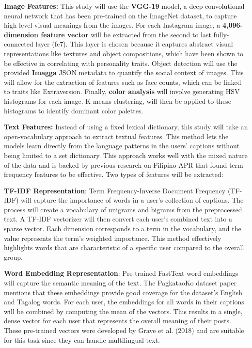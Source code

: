 \textbf{Image Features:}
This study will use the \textbf{VGG-19} model, a deep convolutional neural network that has been pre-trained on the ImageNet dataset, to capture high-level visual meanings from the images. For each Instagram image, a \textbf{4,096-dimension feature vector} will be extracted from the second to last fully-connected layer (fc7). This layer is chosen because it captures abstract visual representations like textures and object compositions, which have been shown to be effective in correlating with personality traits. Object detection will use the provided \textbf{Imagga} JSON metadata to quantify the social context of images.  This will allow for the extraction of features such as face counts, which can be linked to traits like Extraversion.  Finally, \textbf{color analysis} will involve generating HSV histograms for each image. K-means clustering, will then be applied to these histograms to identify dominant color palettes.

\textbf{Text Features:}
Instead of using a fixed lexical dictionary, this study will take an open-vocabulary approach to extract textual features. This method lets the models learn directly from the language patterns in the users' captions without being limited to a set dictionary. This approach works well with the mixed nature of the data and is backed by previous research on Filipino APR that found term-frequency features to be effective. Two types of features will be extracted: 

\textbf{TF-IDF Representation}: Term Frequency-Inverse Document Frequency (TF-IDF) will capture the importance of words in a user's collection of captions. The process will create a vocabulary of unigrams and bigrams from the preprocessed text. A TF-IDF vectorizer will then convert each user's combined text into a sparse vector. Each dimension corresponds to a term in the vocabulary, and the value represents the term's weighted importance. This method effectively highlights words that are characteristic of a specific user compared to the overall group.

\textbf{Word Embedding Representation}: Pre-trained FastText word embeddings will capture the semantic meaning of the text. The PagkataoKo dataset paper mentions that these embeddings provide good coverage for the dataset's English and Tagalog words. For each user, the embeddings for all words in their captions will be combined by computing the mean of the vectors. This results in a single, dense vector for each user that represents the overall meaning of their posts. These pre-trained vectors were developed by Grave et al. (2018) and are suitable for this task since they can handle multilingual text.



